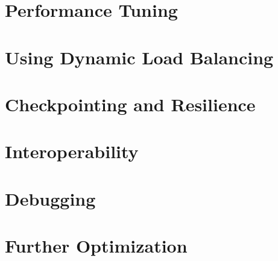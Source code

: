 \documentclass{beamer}
\begin{document}
\section[Tuning]{Performance Tuning}

\section[LB]{Using Dynamic Load Balancing}

\section[Fault Tol]{Checkpointing and Resilience}

\section[AMPI & Interop]{Interoperability}

\section[Debugging]{Debugging}


\section[Messages, Groups, Shared Mem]{Further Optimization}


\end{document}
